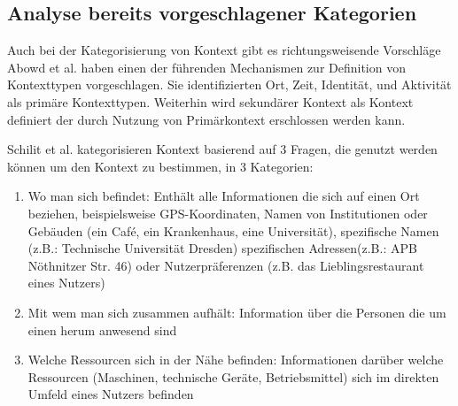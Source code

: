 \subsection{ Analyse bereits vorgeschlagener Kategorien} 
Auch bei der Kategorisierung von Kontext gibt es richtungsweisende Vorschläge
Abowd et al.\cite{abowd_towards_1999} haben einen der führenden Mechanismen zur Definition von Kontexttypen vorgeschlagen. Sie identifizierten Ort, Zeit, Identität, und Aktivität als primäre Kontexttypen. Weiterhin wird sekundärer Kontext als Kontext definiert der durch Nutzung von Primärkontext erschlossen werden kann.

Schilit et al. \cite{schilit_context-aware_1994} kategorisieren Kontext basierend auf 3 Fragen, die genutzt werden können um den Kontext zu bestimmen, in 3 Kategorien:
\begin{enumerate}
\item{Wo man sich befindet: Enthält alle Informationen die sich auf einen Ort beziehen, beispielsweise GPS-Koordinaten, Namen von Institutionen oder Gebäuden (ein Café, ein Krankenhaus, eine Universität), spezifische Namen (z.B.: Technische Universität Dresden) spezifischen Adressen(z.B.: APB Nöthnitzer Str. 46) oder Nutzerpräferenzen (z.B. das Lieblingsrestaurant eines Nutzers) }
\item{Mit wem man sich zusammen aufhält: Information über die Personen die um einen herum anwesend sind}
\item{Welche Ressourcen sich in der Nähe befinden: Informationen darüber welche Ressourcen (Maschinen, technische Geräte, Betriebsmittel) sich im direkten Umfeld eines Nutzers befinden}
\end{enumerate}

